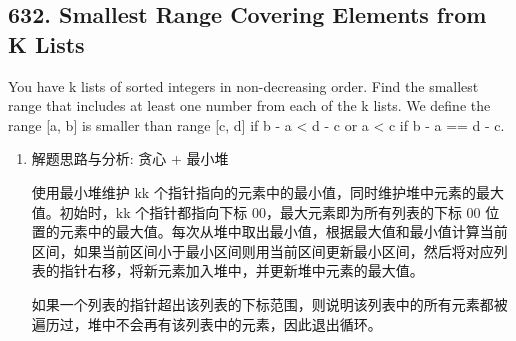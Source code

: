 \documentclass[9pt, b5paaper]{book}
\begin{document}
\subsection{632. Smallest Range Covering Elements from K Lists}
\label{sec-5-0-6}
You have k lists of sorted integers in non-decreasing order. Find the smallest range that includes at least one number from each of the k lists.
We define the range [a, b] is smaller than range [c, d] if b - a < d - c or a < c if b - a == d - c.
\begin{enumerate}
\item 解题思路与分析: 贪心 + 最小堆
\label{sec-5-0-6-1}

使用最小堆维护 kk 个指针指向的元素中的最小值，同时维护堆中元素的最大值。初始时，kk 个指针都指向下标 00，最大元素即为所有列表的下标 00 位置的元素中的最大值。每次从堆中取出最小值，根据最大值和最小值计算当前区间，如果当前区间小于最小区间则用当前区间更新最小区间，然后将对应列表的指针右移，将新元素加入堆中，并更新堆中元素的最大值。

如果一个列表的指针超出该列表的下标范围，则说明该列表中的所有元素都被遍历过，堆中不会再有该列表中的元素，因此退出循环。


\end{enumerate}
\end{document}
